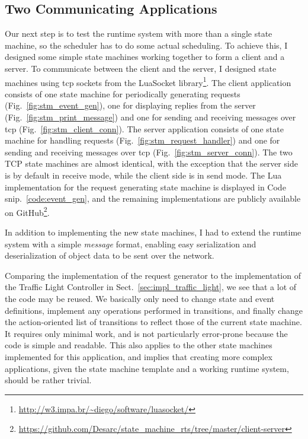 \subsection{Two Communicating Applications}
\label{sec:client_server_app}
Our next step is to test the runtime system with more than a single state machine, so the scheduler has to do some actual scheduling. To achieve this, I designed some simple state machines working together to form a client and a server. To communicate between the client and the server, I designed state machines using \gls{tcp} sockets from the LuaSocket library\footnote{\url{http://w3.impa.br/~diego/software/luasocket/}}. The client application consists of one state machine for periodically generating requests (Fig.~\ref{fig:stm_event_gen}), one for displaying replies from the server (Fig.~\ref{fig:stm_print_message}) and one for sending and receiving messages over \gls{tcp} (Fig.~\ref{fig:stm_client_conn}). The server application consists of one state machine for handling requests (Fig.~\ref{fig:stm_request_handler}) and one for sending and receiving messages over \gls{tcp} (Fig.~\ref{fig:stm_server_conn}). The two TCP state machines are almost identical, with the exception that the server side is by default in receive mode, while the client side is in send mode.
The Lua implementation for the request generating state machine is displayed in Code snip.~\ref{code:event_gen}, and the remaining implementations are publicly available on GitHub\footnote{\url{https://github.com/Desarc/state_machine_rts/tree/master/client-server}}.

In addition to implementing the new state machines, I had to extend the runtime system with a simple \emph{message} format, enabling easy serialization and deserialization of object data to be sent over the network.

Comparing the implementation of the request generator to the implementation of the Traffic Light Controller in Sect.~\ref{sec:impl_traffic_light}, we see that a lot of the code may be reused. We basically only need to change state and event definitions, implement any operations performed in transitions, and finally change the action-oriented list of transitions to reflect those of the current state machine. It requires only minimal work, and is not particularly error-prone because the code is simple and readable. This also applies to the other state machines implemented for this application, and implies that creating more complex applications, given the state machine template and a working runtime system, should be rather trivial.

